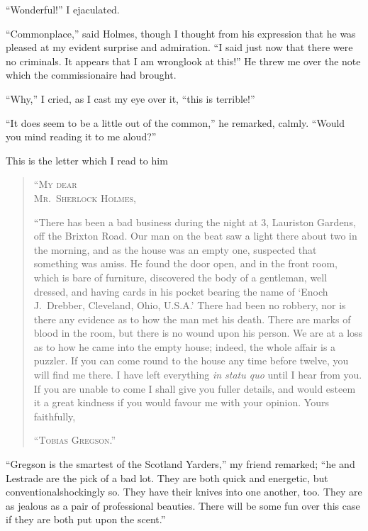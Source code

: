 \documentclass[12pt,english]{book}
\newcommand{\noun}[1]{\textsc{#1}}
\begin{document}
{}``Wonderful!'' I ejaculated.

{}``Commonplace,'' said Holmes, though I thought from his expression
that he was pleased at my evident surprise and admiration. {}``I
said just now that there were no criminals. It appears that I am wrong\mdsh{---}look
at this!'' He threw me over the note which the commissionaire had
brought.

{}``Why,'' I cried, as I cast my eye over it, {}``this is terrible!''

{}``It does seem to be a little out of the common,'' he remarked,
calmly. {}``Would you mind reading it to me aloud?''

This is the letter which I read to him\mdsh{---}

\begin{quotation}
\noindent {}``\noun{My dear }\\
\noun{Mr.\ Sherlock Holmes},\mdsh{---}

{}``There has been a bad business during the night at 3, Lauriston
Gardens, off the Brixton Road. Our man on the beat saw a light there
about two in the morning, and as the house was an empty one, suspected
that something was amiss. He found the door open, and in the front
room, which is bare of furniture, discovered the body of a gentleman,
well dressed, and having cards in his pocket bearing the name of `Enoch
J.\ Drebber, Cleveland, Ohio, U.S.A.' There had been no robbery,
nor is there any evidence as to how the man met his death. There are
marks of blood in the room, but there is no wound upon his person.
We are at a loss as to how he came into the empty house; indeed, the
whole affair is a puzzler. If you can come round to the house any
time before twelve, you will find me there. I have left everything
\textit{in statu quo} until I hear from you. If you are unable to
come I shall give you fuller details, and would esteem it a great
kindness if you would favour me with your opinion. Yours faithfully, 

\begin{flushright}{}``\noun{Tobias Gregson}.''\end{flushright}
\end{quotation}
{}``Gregson is the smartest of the Scotland Yarders,'' my friend
remarked; {}``he and Lestrade are the pick of a bad lot. They are
both quick and energetic, but conventional\mdsh{---}shockingly so.
They have their knives into one another, too. They are as jealous
as a pair of professional beauties. There will be some fun over this
case if they are both put upon the scent.''
\end{document}
